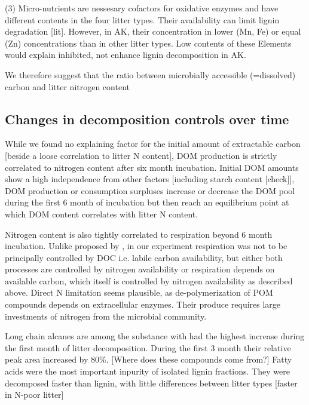 (3) Micro-nutrients are nessesary cofactors for oxidative enzymes and have different contents in the four litter types. Their availability can limit lignin degradation [lit]. However, in AK, their concentration in lower  (Mn, Fe) or equal (Zn) concentrations than in other litter types. Low contents of these Elements would explain inhibited, not enhance lignin decomposition in AK.

We therefore suggest that the ratio between microbially accessible (=dissolved) carbon and litter nitrogen content 


\subsection{Changes in decomposition controls over time}

While we found no explaining factor for the initial amount of extractable carbon [beside a loose correlation to litter N content], DOM production is strictly correlated to nitrogen content after six month incubation. Initial DOM amounts show a high independence from other factors [including starch content [check]], DOM production or consumption surpluses increase or decrease the DOM pool during the first 6 month of incubation but then reach an equilibrium point at which DOM content correlates with litter N content.

Nitrogen content is also tightly correlated to respiration beyond 6 month incubation. Unlike proposed by \cite{Klotzbucher2011}, in our experiment respiration was not to be principally controlled by DOC i.e. labile carbon availability, but either both processes are controlled by nitrogen availability or respiration depends on available carbon, which itself is controlled by nitrogen availability as described above. Direct N limitation seems plausible, as de-polymerization of POM compounds depends on extracellular enzymes. Their produce requires large investments of nitrogen from the microbial community. 


Long chain alcanes are among the substance with had the highest increase during the first month of litter decomposition. During the first 3 month their relative peak area increased by 80\%. [Where does these compounds come from?] Fatty acids were the most important inpurity of isolated lignin fractions. They were decomposed faster than lignin, with little differences between litter types [faster in N-poor litter]



